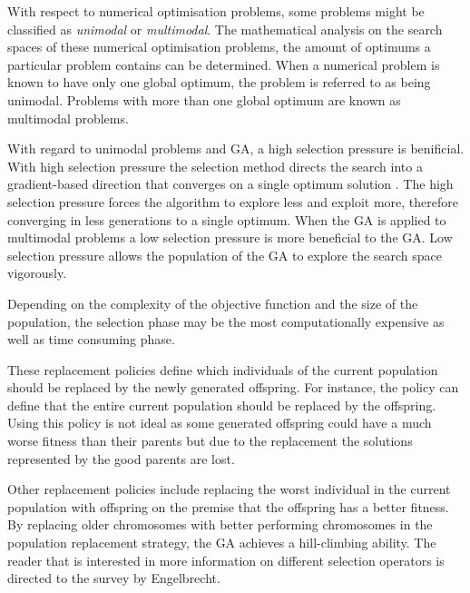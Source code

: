 With respect to numerical optimisation problems, some problems might be classified as \emph{unimodal} or \emph{multimodal}\cite{FirstMathModel, CompuIntelligenceIntro}. The mathematical analysis on the search spaces of these numerical optimisation problems, the amount of optimums a particular problem contains can be determined\cite{FirstMathModel, CompuIntelligenceIntro}. When a numerical problem is known to have only one global optimum, the problem is referred to as being unimodal\cite{FirstMathModel, CompuIntelligenceIntro}. Problems with more than one global optimum are known as multimodal problems\cite{FirstMathModel, CompuIntelligenceIntro}.

With regard to unimodal problems and \gls{GA}, a high selection pressure is benificial\cite{ConstrainedGA}. With high selection pressure the selection method directs the search into a gradient-based direction that converges on a single optimum solution \cite{ConstrainedGA}. The high selection pressure forces the algorithm to explore less and exploit more, therefore converging in less generations to a single optimum. When the \gls{GA} is applied to multimodal problems a low selection pressure is more beneficial to the \gls{GA}\cite{ConstrainedGA}. Low selection pressure allows the population of the \gls{GA} to explore the search space vigorously\cite{ConstrainedGA}.

Depending on the complexity of the objective function and the size of the population, the selection phase may be the most computationally expensive as well as time consuming phase\cite{AcceleratingGA}. 

These replacement policies define which individuals of the current population should be replaced by the newly generated offspring\cite{CompuIntelligenceIntro}. For instance, the policy can define that the entire current population should be replaced by the offspring\cite{CompuIntelligenceIntro}. Using this policy is not ideal as some generated offspring could have a much worse fitness than their parents but due to the replacement the solutions represented by the good parents are lost\cite{CompuIntelligenceIntro}. 

Other replacement policies include replacing the worst individual in the current population with offspring on the premise that the offspring has a better fitness\cite{CompuIntelligenceIntro}. By replacing older chromosomes with better performing chromosomes in the population replacement strategy, the \gls{GA} achieves a hill-climbing ability. The reader that is interested in more information on different selection operators is directed to the survey by Engelbrecht\cite{CompuIntelligenceIntro}.
